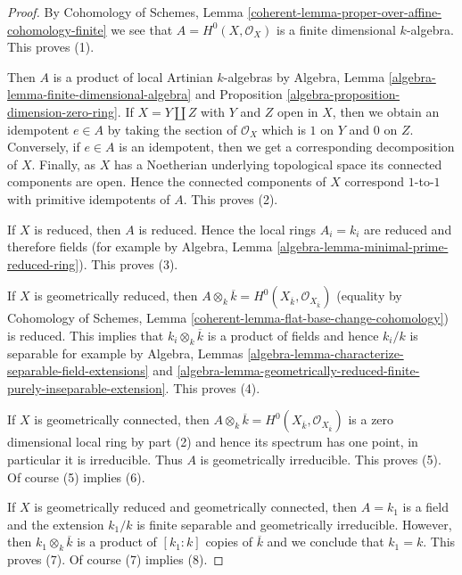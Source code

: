 \begin{proof}
By Cohomology of Schemes, Lemma
\ref{coherent-lemma-proper-over-affine-cohomology-finite}
we see that $A = H^0(X, \mathcal{O}_X)$ is a finite dimensional
$k$-algebra. This proves (1).

\medskip\noindent
Then $A$ is a product of local Artinian $k$-algebras by
Algebra, Lemma \ref{algebra-lemma-finite-dimensional-algebra} and
Proposition \ref{algebra-proposition-dimension-zero-ring}.
If $X = Y \amalg Z$ with $Y$ and $Z$ open in $X$, then we obtain
an idempotent $e \in A$ by taking the section of $\mathcal{O}_X$
which is $1$ on $Y$ and $0$ on $Z$. Conversely, if $e \in A$
is an idempotent, then we get a corresponding decomposition of $X$.
Finally, as $X$ has a Noetherian underlying topological space
its connected components are open. Hence the connected components
of $X$ correspond $1$-to-$1$ with primitive idempotents of $A$.
This proves (2).

\medskip\noindent
If $X$ is reduced, then $A$ is reduced. Hence the local rings $A_i = k_i$
are reduced and therefore fields (for example by
Algebra, Lemma \ref{algebra-lemma-minimal-prime-reduced-ring}).
This proves (3).

\medskip\noindent
If $X$ is geometrically reduced, then
$A \otimes_k \overline{k} =
H^0(X_{\overline{k}}, \mathcal{O}_{X_{\overline{k}}})$
(equality by Cohomology of Schemes, Lemma
\ref{coherent-lemma-flat-base-change-cohomology}) is reduced.
This implies that $k_i \otimes_k \overline{k}$ is a product
of fields and hence $k_i/k$ is separable for example by
Algebra,
Lemmas \ref{algebra-lemma-characterize-separable-field-extensions} and
\ref{algebra-lemma-geometrically-reduced-finite-purely-inseparable-extension}.
This proves (4).

\medskip\noindent
If $X$ is geometrically connected, then $A \otimes_k \overline{k} =
H^0(X_{\overline{k}}, \mathcal{O}_{X_{\overline{k}}})$
is a zero dimensional local ring by part (2) and hence its
spectrum has one point, in particular it is irreducible.
Thus $A$ is geometrically irreducible. This proves (5).
Of course (5) implies (6).

\medskip\noindent
If $X$ is geometrically reduced and geometrically connected, then
$A = k_1$ is a field and the extension $k_1/k$ is finite separable and
geometrically irreducible. However, then $k_1 \otimes_k \overline{k}$
is a product of $[k_1 : k]$ copies of $\overline{k}$ and we conclude
that $k_1 = k$. This proves (7). Of course (7) implies (8).
\end{proof}

